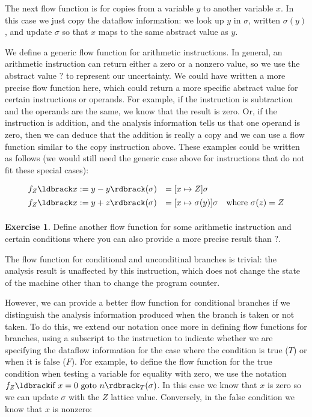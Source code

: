 \documentclass[11pt]{article}
\newcommand{\exercise}[1]
  {\bigskip \noindent
   {\bf Exercise #1}.}
\newcommand{\printanswer}[1]
  {}   %
\newcommand{\answer}[2]
  {\bigskip \printanswer{\noindent
   {\bf Sample Answer #1}. #2 \bigskip}}
\newcommand{\parg}[1] %
  {\ldbrack #1 \rdbrack}
\begin{document}
The next flow function is for copies from a variable $y$ to another variable
$x$.  In this case we just copy the dataflow information: we look up $y$ in
$\sigma$, written $\sigma(y)$, and update $\sigma$ so that $x$ maps to the same
abstract value as $y$.

We define a generic flow function for arithmetic instructions.  In general, an
arithmetic instruction can return either a zero or a nonzero value, so we use
the abstract value $?$ to represent our uncertainty.  We could have written a
more precise flow function here, which could return a more specific abstract
value for certain instructions or operands.  For example, if the instruction is
subtraction and the operands are the same, we know that the result is zero.  Or,
if the instruction is addition, and the analysis information tells us that one
operand is zero, then we can deduce that the addition is really a copy and we
can use a flow function similar to the copy instruction above.  These examples
could be written as follows (we would still need the generic case above for
instructions that do not fit these special cases):

\[
\begin{array}{lll}

f_Z\parg{x := y - y}(\sigma) & = [x \mapsto Z]\sigma\\[1ex]
f_Z\parg{x := y + z}(\sigma) & = [x \mapsto \sigma(y)]\sigma & \mbox{where}~ \sigma(z)=Z\\[1ex]

\end{array}
\]



\exercise{1} Define another flow function for some arithmetic instruction and
certain conditions where you can also provide a more precise result than $?$.

\answer{1}{We can define the following flow function for multiplication by
  zero:\\ \[f_Z\parg{x := y * z}(\sigma) = [x \mapsto Z]\sigma ~~~~
  \mbox{where}~ \sigma(y)=Z \lor \sigma(z)=Z \]}

The flow function for conditional and unconditinal branches is trivial: the
analysis result is unaffected by this instruction, which does not change the
state of the machine other than to change the program counter.

However, we can provide a better flow function for conditional branches if we
distinguish the analysis information produced when the branch is taken or not
taken.  To do this, we extend our notation once more in defining flow functions
for branches, using a subscript to the instruction to indicate whether we are
specifying the dataflow information for the case where the condition is true
($T$) or when it is false ($F$).  For example, to define the flow function for
the true condition when testing a variable for equality with zero, we use the
notation $f_Z\parg{\mbox{if}~x=0~\mbox{goto}~n}_T(\sigma)$.  In this case we
know that $x$ is zero so we can update $\sigma$ with the $Z$ lattice value.
Conversely, in the false condition we know that $x$ is nonzero:
\end{document}
